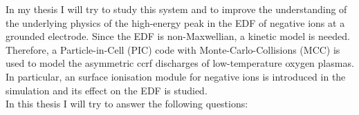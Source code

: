         In my thesis I will try to study this system and to improve the understanding of the underlying physics of the high-energy peak in the EDF of negative ions at a grounded electrode. Since the EDF is non-Maxwellian, a kinetic model is needed. Therefore, a Particle-in-Cell (PIC) code with Monte-Carlo-Collisions (MCC) is used to model the asymmetric ccrf discharges of low-temperature oxygen plasmas. In particular, an surface ionisation module for negative ions is introduced in the simulation and its effect on the EDF is studied.\\
        In this thesis I will try to answer the following questions:
      
        \begingroup\par
            \centering
            \bigskip{}
            \bigskip\par
        \endgroup
        
